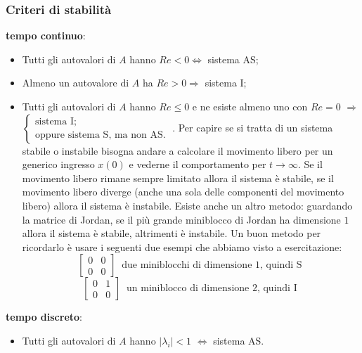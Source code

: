 \begin{landscape}
    \subsubsection*{Criteri di stabilità}
    \textbf{tempo continuo}:
    \begin{itemize}
        \item Tutti gli autovalori di $A$ hanno $Re < 0 \Longleftrightarrow $ sistema AS;
        \item Almeno un autovalore di $A$ ha $Re > 0 \Longrightarrow$ sistema I;
        \item Tutti gli autovalori di $A$ hanno $Re \leq 0$ e ne esiste almeno uno con $Re = 0$ $\Longrightarrow$ $\begin{cases}
            \text{sistema I;}\;\\
            \text{oppure sistema S, ma non AS.}\;
        \end{cases}$. \newline
        Per capire se si tratta di un sistema stabile o instabile bisogna andare a calcolare il movimento libero per un generico ingresso $x(0)$ e vederne il comportamento per $t \rightarrow \infty$. Se il movimento libero rimane sempre limitato allora il sistema è stabile, se il movimento libero diverge (anche una sola delle componenti del movimento libero) allora il sistema è instabile. \newline
        Esiste anche un altro metodo: guardando la matrice di Jordan, se il più grande miniblocco di Jordan ha dimensione $1$ allora il sistema è stabile, altrimenti è instabile. Un buon metodo per ricordarlo è usare i seguenti due esempi che abbiamo visto a esercitazione:
        \[
            \left[\begin{matrix}
                0 & 0 \\
                0 & 0
            \end{matrix}\right] \;\;\text{due miniblocchi di dimensione 1, quindi S}\;
        \]
        \[
            \left[\begin{matrix}
                0&1\\
                0&0
            \end{matrix}\right] \;\; \text{un miniblocco di dimensione 2, quindi I}\;
        \]
    \end{itemize}
    \textbf{tempo discreto}:
    \begin{itemize}
        \item Tutti gli autovalori di $A$ hanno $|\lambda_i| < 1$ $\Longleftrightarrow$ sistema AS.

\end{itemize}
\end{landscape}
